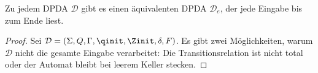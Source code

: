 \begin{lemma}[name={[\acs*{DPDA}, der gesamte Eingabe verarbeitet]}]
        \label{lem:DPDA ges. Eingabe}
        Zu jedem \ac{DPDA} $\mathcal{D}$ gibt es einen äquivalenten \ac{DPDA} $\mathcal{D}_e$, der
        jede Eingabe bis zum Ende liest.
\end{lemma}
\begin{proof}

  Sei $\mathcal{D} = (\Sigma, Q, \Gamma, \qinit, \Zinit, \delta, F)$. 
  Es gibt zwei Möglichkeiten, warum $\mathcal{D}$ nicht die gesamte Eingabe verarbeitet:
  Die Transitionsrelation ist nicht total 
  oder der Automat bleibt bei
  leerem Keller stecken.


\end{proof}

